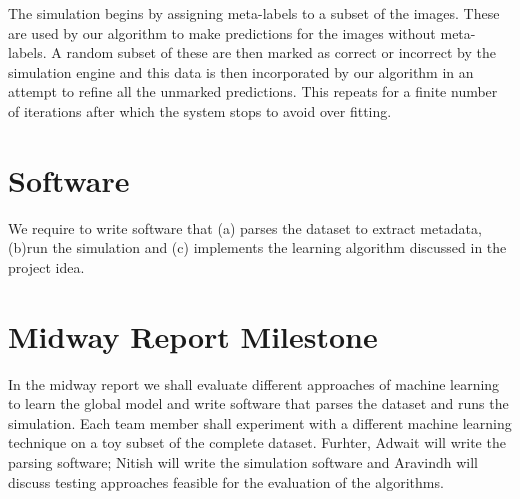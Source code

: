 \documentclass{article} %
\begin{document}
The simulation begins by assigning meta-labels to a subset of the images. These are used by our algorithm to make predictions for the images without meta-labels. A random subset of these are then marked as correct or incorrect by the simulation engine and this data is then incorporated by our algorithm in an attempt to refine all the unmarked predictions. This repeats for a finite number of iterations after which the system stops to avoid over fitting.

\section{Software}
We require to write software that (a) parses the dataset to extract metadata, (b)run the simulation and (c) implements the learning algorithm discussed in the project idea.

\section{Midway Report Milestone}
In the midway report we shall evaluate different approaches of machine learning to learn the global model and write software that parses the dataset and runs the simulation. Each team member shall experiment with a different machine learning technique on a toy subset of the complete dataset. Furhter, Adwait will write the parsing software; Nitish will write the simulation software and Aravindh will discuss testing approaches feasible for the evaluation of the algorithms.
\end{document}
